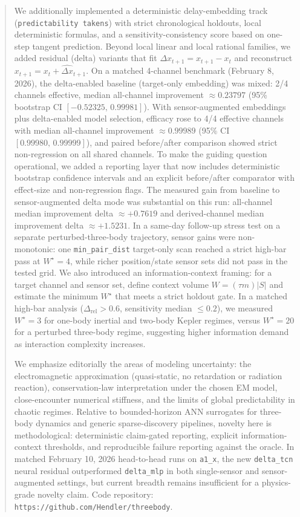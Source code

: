 \documentclass[11pt]{article}
\begin{document}
\begin{abstract}
We additionally implemented a deterministic delay-embedding track (\texttt{predictability takens}) with strict chronological holdouts, local deterministic formulas, and a sensitivity-consistency score based on one-step tangent prediction. Beyond local linear and local rational families, we added residual (delta) variants that fit $\Delta x_{t+1}=x_{t+1}-x_t$ and reconstruct $x_{t+1}=x_t+\widehat{\Delta x}_{t+1}$. On a matched 4-channel benchmark (February 8, 2026), the delta-enabled baseline (target-only embedding) was mixed: 2/4 channels effective, median all-channel improvement $\approx 0.23797$ (95\% bootstrap CI $[-0.52325,\,0.99981]$). With sensor-augmented embeddings plus delta-enabled model selection, efficacy rose to 4/4 effective channels with median all-channel improvement $\approx 0.99989$ (95\% CI $[0.99980,\,0.99999]$), and paired before/after comparison showed strict non-regression on all shared channels.
To make the guiding question operational, we added a reporting layer that now includes deterministic bootstrap confidence intervals and an explicit before/after comparator with effect-size and non-regression flags. The measured gain from baseline to sensor-augmented delta mode was substantial on this run: all-channel median improvement delta $\approx +0.7619$ and derived-channel median improvement delta $\approx +1.5231$.
In a same-day follow-up stress test on a separate perturbed-three-body trajectory, sensor gains were non-monotonic: one \texttt{min\_pair\_dist} target-only scan reached a strict high-bar pass at $W^\star=4$, while richer position/state sensor sets did not pass in the tested grid.
We also introduced an information-context framing: for a target channel and sensor set, define context volume $W=(\tau m)|S|$ and estimate the minimum $W^\star$ that meets a strict holdout gate. In a matched high-bar analysis ($\Delta_{\mathrm{rel}}>0.6$, sensitivity median $\le 0.2$), we measured $W^\star=3$ for one-body inertial and two-body Kepler regimes, versus $W^\star=20$ for a perturbed three-body regime, suggesting higher information demand as interaction complexity increases.

We emphasize editorially the areas of modeling uncertainty: the electromagnetic approximation (quasi-static, no retardation or radiation reaction)\cite{Darwin1920}, conservation-law interpretation under the chosen EM model, close-encounter numerical stiffness, and the limits of global predictability in chaotic regimes\cite{Lorenz1963}. Relative to bounded-horizon ANN surrogates for three-body dynamics\cite{Breen2020} and generic sparse-discovery pipelines\cite{Brunton2016}, novelty here is methodological: deterministic claim-gated reporting, explicit information-context thresholds, and reproducible failure reporting against the oracle. In matched February 10, 2026 head-to-head runs on \texttt{a1\_x}, the new \texttt{delta\_tcn} neural residual outperformed \texttt{delta\_mlp} in both single-sensor and sensor-augmented settings, but current breadth remains insufficient for a physics-grade novelty claim.
Code repository: \texttt{https://github.com/Hendler/threebody}.
\end{abstract}
\end{document}
